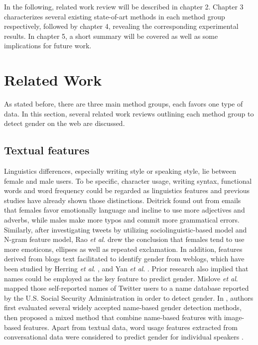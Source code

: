 \documentclass[runningheads]{llncs}
\begin{document}
	In the following, related work review will be described in chapter 2. Chapter 3 characterizes several existing state-of-art methods in each method group respectively, followed by chapter 4, revealing the corresponding experimental results. In chapter 5, a short summary will be covered as well as some implications for future work. 

	
	\section{Related Work}
	
	As stated before, there are three main method groups, each favors one type of data. In this section, several related work reviews outlining each method group to detect gender on the web are discussed. 
	
	\subsection{Textual features}
	
	Linguistics differences, especially writing style or speaking style, lie between female and male users. To be specific, character usage, writing syntax, functional words and word frequency could be regarded as linguistics features \cite{deitrick2012author} and previous studies have already shown those distinctions. Deitrick \cite{deitrick2012author} found out from emails that females favor emotionally language and incline to use more adjectives and adverbs, while males make more typos and commit more grammatical errors. Similarly, after investigating tweets by utilizing sociolinguistic-based model and N-gram feature model, Rao \textit{et al}. \cite{rao2010classifying} drew the conclusion that females tend to use more emoticons, ellipses as well as repeated exclamation. In addition, features derived from blogs text facilitated to identify gender from weblogs, which have been studied by Herring \textit{et al}. \cite{herring2004bridging}, and Yan \textit{et al}. \cite{yan2006gender}. Prior research also implied that names could be employed as the key feature to predict gender. Mislove \textit{et al}. \cite{mislove2011understanding} mapped those self-reported names of Twitter users to a name database reported by the U.S. Social Security Administration in order to detect gender.  In \cite{karimi2016inferring}, authors first evaluated several widely accepted name-based gender detection methods, then proposed a mixed method that combine name-based features with image-based features. Apart from textual data, word usage features extracted from conversational data were considered  to predict gender for individual speakers \cite{gillick2010can}.  
	
\end{document}
